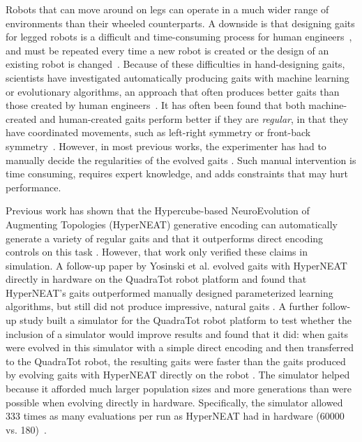 
Robots that can move around on legs can operate in a much wider range of environments than their wheeled counterparts. A downside is that designing gaits for legged robots is a difficult and time-consuming process for human engineers~\cite{strom1999legged,wettergreen1992gait}, and must be repeated every time a new robot is created or the design of an existing robot is changed~\cite{hornby2005autonomous}. 
Because of these difficulties in hand-designing gaits, scientists have investigated automatically producing gaits with machine learning or evolutionary algorithms, an approach that often produces better gaits than those created by human engineers~\cite{valsalam:mii,kohl:stone,hornby2005autonomous,hornby2003generative,yos:clune}. It has often been found that both machine-created and human-created gaits perform better if they are \emph{regular}, in that they have coordinated movements, such as left-right symmetry or front-back symmetry~\cite{valsalam:mii,clune2011performance,clune2009evolving,clune2009sensitivity}.
However, in most previous works, the experimenter has had to manually decide the regularities of the evolved gaits \cite{valsalam:mii,tellez,beer,raibert}. 
Such manual intervention is time consuming, requires expert knowledge, and adds constraints that may hurt performance. 

Previous work has shown that the Hypercube-based NeuroEvolution of Augmenting Topologies (HyperNEAT) generative encoding \cite{stanley2009hypercube} can automatically generate a variety of regular gaits and that it outperforms direct encoding controls on this task \cite{clune2009evolving,clune2011performance}.
However, that work only verified these claims in simulation. 
A follow-up paper by Yosinski et al. evolved gaits with HyperNEAT directly in hardware on the QuadraTot robot platform and found that HyperNEAT's gaits outperformed manually designed parameterized learning algorithms, but still did not produce impressive, natural gaits \cite{yos:clune}. 
A further follow-up study built a simulator for the QuadraTot robot platform to test whether the inclusion of a simulator would improve results and found that it did:  when gaits were evolved in this simulator with a simple direct encoding and then transferred to the QuadraTot robot, the resulting gaits were faster than the gaits produced by evolving gaits with HyperNEAT directly on the robot \cite{glette}. 
The simulator helped because it afforded much larger population sizes and more generations than were possible when evolving directly in hardware. Specifically, the simulator allowed 333 times as many evaluations per run as HyperNEAT had in hardware (60000 vs. 180)~\cite{yos:clune,glette}. 

